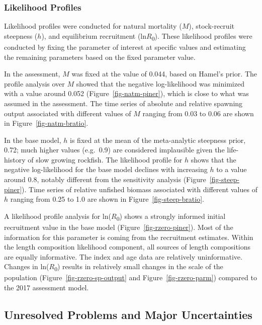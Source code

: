 \documentclass[
]{scrartcl}
\begin{document}
\subsubsection{Likelihood Profiles}\label{likelihood-profiles}

Likelihood profiles were conducted for natural mortality (\(M\)),
stock-recruit steepness (\(h\)), and equilibrium recruitment
(ln\(R\)\textsubscript{0}). These likelihood profiles were conducted by
fixing the parameter of interest at specific values and estimating the
remaining parameters based on the fixed parameter value.

In the assessment, \(M\) was fixed at the value of 0.044, based on
Hamel's prior. The profile analysis over \(M\) showed that the negative
log-likelihood was minimized with a value around 0.052
(Figure~\ref{fig-natm-piner}), which is close to what was assumed in the
assessment. The time series of absolute and relative spawning output
associated with different values of \(M\) ranging from 0.03 to 0.06 are
shown in Figure~\ref{fig-natm-bratio}.

In the base model, \(h\) is fixed at the mean of the meta-analytic
steepness prior, 0.72; much higher values (e.g.~0.9) are considered
implausible given the life-history of slow growing rockfish. The
likelihood profile for \(h\) shows that the negative log-likelihood for
the base model declines with increasing \(h\) to a value around 0.8,
notably different from the sensitivity analysis
(Figure~\ref{fig-steep-piner}). Time series of relative unfished biomass
associated with different values of \(h\) ranging from 0.25 to 1.0 are
shown in Figure~\ref{fig-steep-bratio}.

A likelihood profile analysis for ln(\(R\)\textsubscript{0}) shows a
strongly informed initial recruitment value in the base model
(Figure~\ref{fig-rzero-piner}). Most of the information for this
parameter is coming from the recruitment estimates. Within the length
composition likelihood component, all sources of length compositions are
equally informative. The index and age data are relatively
uninformative. Changes in ln(\(R\)\textsubscript{0}) results in
relatively small changes in the scale of the population
(Figure~\ref{fig-rzero-sp-output} and Figure~\ref{fig-rzero-parm})
compared to the 2017 assessment model.

\subsection{Unresolved Problems and Major
Uncertainties}\label{unresolved-problems-and-major-uncertainties}
\end{document}
